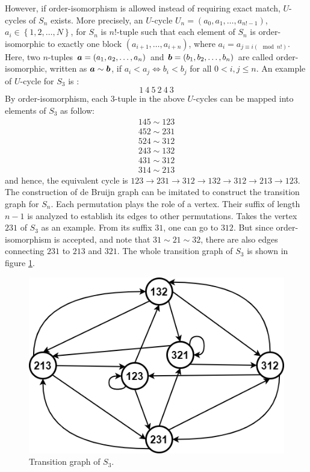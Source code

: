 However, if order-isomorphism is allowed instead of requiring exact match, $U$-cycles of $S_{n}$ exists. More precisely, an $U$-cycle $U_{n}=(a_{0},a_{1},\ldots,a_{n!-1})$, $a_{i}\in\left\{1,2,\ldots,N\right\}$, for $S_{n}$ is $n!$-tuple such that each element of $S_{n}$ is order-isomorphic to exactly one block $(a_{i+1},\ldots,a_{i+n})$, where $a_{i}=a_{j\equiv i(\mod n!)}$. Here, two $n$-tuples ${\boldsymbol a}=\left(a_{1},a_{2},\ldots,a_{n}\right)$ and ${\boldsymbol b}=\left(b_{1},b_{2},\ldots,b_{n}\right)$ are called order-isomorphic, written as ${\boldsymbol a}\sim{\boldsymbol b}$, if $a_{i}<a_{j} \Leftrightarrow b_{i}<b_{j}$ for all $0<i,j\leq n$. An example of $U$-cycle for $S_{3}$ is :
\[1\ 4\ 5\ 2\ 4 \ 3\]
By order-isomorphism, each $3$-tuple in the above $U$-cycles can be mapped into elements of $S_{3}$ as follow:
\begin{align*}
    145\sim123 \\
    452\sim231 \\
    524\sim312 \\
    243\sim132 \\
    431\sim312 \\
    314\sim213 
\end{align*}
and hence, the equivalent cycle is $123\rightarrow 231\rightarrow 312\rightarrow132\rightarrow312\rightarrow 213\rightarrow123 $. The construction of de Bruijn graph can be imitated to construct the transition graph for $S_{n}$. Each permutation plays the role of a vertex. Their suffix of length $n-1$ is analyzed to establish its edges to other permutations. Takes the vertex $231$ of $S_{3}$ as an example. From its suffix $31$, one can go to $312$. But since order-isomorphism is accepted, and note that $31\sim21\sim32$, there are also edges connecting $231$ to $213$ and $321$. The whole transition graph of $S_{3}$ is shown in figure \ref{fig:S3_graph}.

\begin{figure}[htbp]
    \centering
    \includegraphics[scale=0.5]{fig/PermutationGraph.png}
    \caption{Transition graph of $S_{3}$.}
    \label{fig:S3_graph}
\end{figure}

